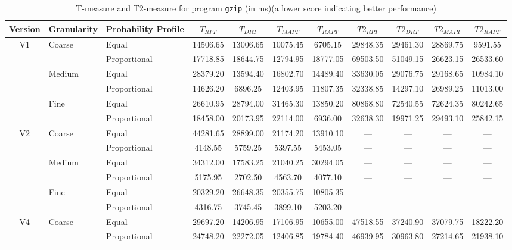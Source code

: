\documentclass[10pt,journal,cspaper,compsoc,onecolumn]{IEEEtran}
\begin{document}
\begin{table}
\caption{T-measure and T2-measure for program \texttt{gzip} (in ms)(a lower score indicating better performance)}
\label{tab:Tgzip}
\centering
\begin{tabular}{|c|l|l|c|c|c|c|c|c|c|c|} \hline
Version	& Granularity	& Probability Profile	& $T_{RPT}$	& $T_{DRT}$	& $T_{MAPT}$	& $T_{RAPT}$	& $T2_{RPT}$	& $T2_{DRT}$	& $T2_{MAPT}$	 & $T2_{RAPT}$	\\ \hline
V1	& Coarse	& Equal	& 14506.65	& 13006.65	& 10075.45	& 6705.15	& 29848.35	& 29461.30	& 28869.75	& 9591.55	 \\ \cline{3-11}
	& 	& Proportional	& 17718.85	& 18644.75	& 12794.95	& 18777.05	& 69503.50	& 51049.15	& 26623.15	& 26533.60	 \\ \cline{2-11}
	& Medium	& Equal	& 28379.20	& 13594.40	& 16802.70	& 14489.40	& 33630.05	& 29076.75	& 29168.65	& 10984.10	 \\ \cline{3-11}
	& 	& Proportional	& 14626.20	& 6896.25	& 12403.95	& 11807.35	& 32338.85	& 14297.10	& 26989.25	& 11013.00	 \\ \cline{2-11}
	& Fine	& Equal	& 26610.95	& 28794.00	& 31465.30	& 13850.20	& 80868.80	& 72540.55	& 72624.35	& 80242.65	 \\ \cline{3-11}
	& 	& Proportional	& 18458.00	& 20173.95	& 22114.00	& 6936.00	& 32638.30	& 19971.25	& 29493.10	& 25842.15	 \\ \hline
V2	& Coarse	& Equal	& 44281.65	& 28899.00	& 21174.20	& 13910.10	& ---	& ---	& ---	& ---	 \\ \cline{3-11}
	& 	& Proportional	& 4148.55	& 5759.25	& 5397.55	& 5453.05	& ---	& ---	& ---	& ---	 \\ \cline{2-11}
	& Medium	& Equal	& 34312.00	& 17583.25	& 21040.25	& 30294.05	& ---	& ---	& ---	& ---	 \\ \cline{3-11}
	& 	& Proportional	& 5175.95	& 2702.50	& 4563.70	& 4077.10	& ---	& ---	& ---	& ---	 \\ \cline{2-11}
	& Fine	& Equal	& 20329.20	& 26648.35	& 20355.75	& 10805.35	& ---	& ---	& ---	& ---	 \\ \cline{3-11}
	& 	& Proportional	& 4316.75	& 3745.45	& 3899.10	& 5203.20	& ---	& ---	& ---	& ---	 \\ \hline
V4	& Coarse	& Equal	& 29697.20	& 14206.95	& 17106.95	& 10655.00	& 47518.55	& 37240.90	& 37079.75	& 18222.20	 \\ \cline{3-11}
	& 	& Proportional	& 24748.20	& 22272.05	& 12406.85	& 19784.40	& 46939.95	& 30963.80	& 27214.65	& 21938.10	 \\ \cline{2-11}

\end{tabular}
\end{table}
\end{document}
